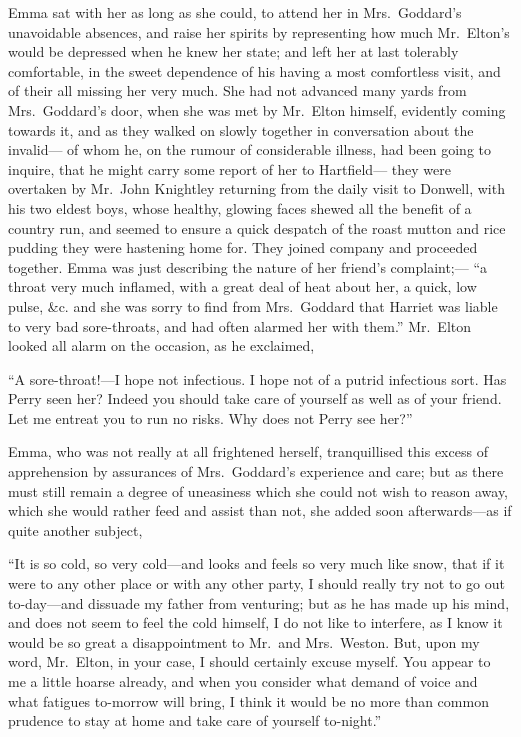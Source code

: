 Emma sat with her as long as she could, to attend her in Mrs.\ Goddard's
unavoidable absences, and raise her spirits by representing how much
Mr.\ Elton's would be depressed when he knew her state; and left her
at last tolerably comfortable, in the sweet dependence of his having
a most comfortless visit, and of their all missing her very much.
She had not advanced many yards from Mrs.\ Goddard's door, when she
was met by Mr.\ Elton himself, evidently coming towards it, and as
they walked on slowly together in conversation about the invalid---%
of whom he, on the rumour of considerable illness, had been going
to inquire, that he might carry some report of her to Hartfield---%
they were overtaken by Mr.\ John Knightley returning from the
daily visit to Donwell, with his two eldest boys, whose healthy,
glowing faces shewed all the benefit of a country run, and seemed
to ensure a quick despatch of the roast mutton and rice pudding they
were hastening home for.  They joined company and proceeded together.
Emma was just describing the nature of her friend's complaint;---%
``a throat very much inflamed, with a great deal of heat about her,
a quick, low pulse, \&c.  and she was sorry to find from Mrs.\ Goddard
that Harriet was liable to very bad sore-throats, and had often
alarmed her with them.''  Mr.\ Elton looked all alarm on the occasion,
as he exclaimed,

``A sore-throat!---I hope not infectious.  I hope not of a putrid
infectious sort.  Has Perry seen her?  Indeed you should take care
of yourself as well as of your friend.  Let me entreat you to run
no risks.  Why does not Perry see her?''

Emma, who was not really at all frightened herself, tranquillised this
excess of apprehension by assurances of Mrs.\ Goddard's experience
and care; but as there must still remain a degree of uneasiness
which she could not wish to reason away, which she would rather
feed and assist than not, she added soon afterwards---as if quite
another subject,

``It is so cold, so very cold---and looks and feels so very much
like snow, that if it were to any other place or with any other party,
I should really try not to go out to-day---and dissuade my father
from venturing; but as he has made up his mind, and does not seem
to feel the cold himself, I do not like to interfere, as I know it
would be so great a disappointment to Mr.\ and Mrs.\ Weston.  But, upon
my word, Mr.\ Elton, in your case, I should certainly excuse myself.
You appear to me a little hoarse already, and when you consider
what demand of voice and what fatigues to-morrow will bring,
I think it would be no more than common prudence to stay at home
and take care of yourself to-night.''

